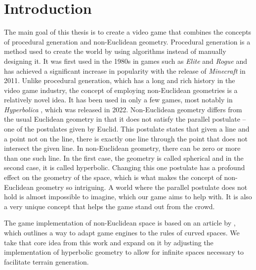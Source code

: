 \chapter{Introduction}\label{ch:introduction}

The main goal of this thesis is to create a video game that combines the concepts of procedural generation and non-Euclidean geometry.
Procedural generation is a method used to create the world by using algorithms instead of manually designing it.
It was first used in the 1980s in games such as \textit{Elite} \cite{Elite1984} and \textit{Rogue} \cite{Rogue1980} and has achieved a significant increase in popularity with the release of \textit{Minecraft} \cite{Minecraft} in 2011.
Unlike procedural generation, which has a long and rich history in the video game industry, the concept of employing non-Euclidean geometries is a relatively novel idea.
It has been used in only a few games, most notably in \textit{Hyperbolica} \cite{Hyperbolica}, which was released in 2022.
Non-Euclidean geometry differs from the usual Euclidean geometry in that it does not satisfy the parallel postulate -- one of the postulates given by Euclid.
This postulate states that given a line and a point not on the line, there is exactly one line through the point that does not intersect the given line.
In non-Euclidean geometry, there can be zero or more than one such line.
In the first case, the geometry is called spherical and in the second case, it is called hyperbolic.
Changing this one postulate has a profound effect on the geometry of the space, which is what makes the concept of non-Euclidean geometry so intriguing.
A world where the parallel postulate does not hold is almost impossible to imagine, which our game aims to help with.
It is also a very unique concept that helps the game stand out from the crowd.

The game implementation of non-Euclidean space is based on an article by \citeauthor{Szirmay-Kalos2022} \cite{Szirmay-Kalos2022}, which outlines a way to adapt game engines to the rules of curved spaces.
We take that core idea from this work and expand on it by adjusting the implementation of hyperbolic geometry to allow for infinite spaces necessary to facilitate terrain generation.

